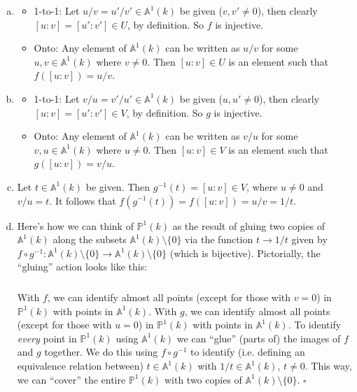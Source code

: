 \documentclass[12pt]{article}
\begin{document}
\begin{enumerate}[(a)]
	\item 
	\begin{itemize}
		\item 1-to-1: Let $u/v = u'/v' \in \mathbb{A}^1(k)$ be given ($v,v'\neq 0$), then clearly $[u:v] = [u':v'] \in U$, by definition. So $f$ is injective.
		\item Onto: Any element of $\mathbb{A}^1(k)$ can be written as $u/v$ for some $u,v\in \mathbb{A}^1(k)$ where $v\neq 0$. Then $[u:v]\in U$ is an element such that $f([u:v]) = u/v$. 
	\end{itemize}
	\item 
	\begin{itemize}
		\item 1-to-1: Let $v/u = v'/u' \in \mathbb{A}^1(k)$ be given ($u,u'\neq 0$), then clearly $[u:v] = [u':v'] \in V$, by definition. So $g$ is injective.
		\item Onto: Any element of $\mathbb{A}^1(k)$ can be written as $v/u$ for some $v,u\in \mathbb{A}^1(k)$ where $u\neq 0$. Then $[u:v]\in V$ is an element such that $g([u:v]) = v/u$. 
	\end{itemize} 
	\item Let $t\in \mathbb{A}^1(k)$ be given. Then $g^{-1}(t) = [u:v] \in V$, where $u\neq 0$ and $v/u = t$. It follows that $f(g^{-1}(t)) = f([u:v]) = u/v = 1/t$.
	\item Here's how we can think of $\mathbb{P}^1(k)$ as the result of gluing two copies of $\mathbb{A}^1(k)$ along the subsets $\mathbb{A}^1(k)\setminus \{0\}$ via the function $t\to 1/t$ given by $f\circ g^{-1}: \mathbb{A}^1(k)\setminus\{0\} \to \mathbb{A}^1(k)\setminus\{0\}$ (which is bijective). Pictorially, the ``gluing'' action looks like this:
	\begin{align*}
	\,\\\,\\\,\\
	\end{align*}
	With $f$, we can identify almost all points (except for those with $v=0$) in $\mathbb{P}^1(k)$ with points in $\mathbb{A}^1(k)$. With $g$, we can identify almost all points (except for those with $u=0$) in $\mathbb{P}^1(k)$ with points in $\mathbb{A}^1(k)$. To identify \textit{every} point in $\mathbb{P}^1(k)$ using $\mathbb{A}^1(k)$ we can ``glue'' (parts of) the images of $f$ and $g$ together. We do this using $f\circ g^{-1}$ to identify (i.e. defining an equivalence relation between) $t \in \mathbb{A}^{1}(k)$ with $1/t \in \mathbb{A}^1(k)$, $t\neq 0$. This way, we can ``cover'' the entire $\mathbb{P}^1(k)$ with two copies of $\mathbb{A}^1(k)\setminus\{0\}$.  \hfill$\square$ 
\end{enumerate}
\end{document}
